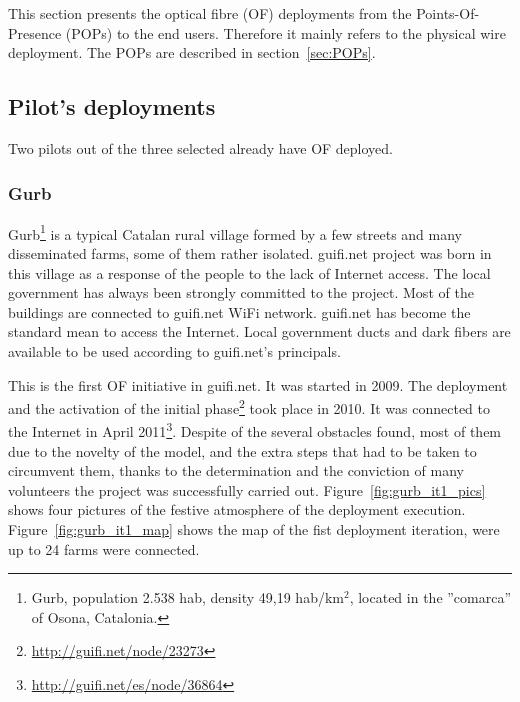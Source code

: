 This section presents the optical fibre (OF) deployments from the Points-Of-Presence (POPs) to the end users. Therefore it mainly refers to the physical wire deployment. The POPs are described in section~\ref{sec:POPs}.


\subsection{Pilot's deployments}

Two pilots out of the three selected already have OF deployed.

\subsubsection{Gurb}

Gurb\footnote{Gurb, population 2.538 hab, density 49,19 hab/km$^{2}$, located in the ''comarca'' of Osona, Catalonia.} is a typical Catalan rural village formed by a few streets and many disseminated farms, some of them rather isolated. guifi.net project was born in this village as a response of the people to the lack of Internet access. The local government has always been strongly committed to the project. Most of the buildings are connected to guifi.net WiFi network. guifi.net has become the standard mean to access the Internet. Local government ducts and dark fibers are available to be used according to guifi.net's principals.

This is the first OF initiative in guifi.net. It was started in 2009. The deployment and the activation of the initial phase\footnote{\url{http://guifi.net/node/23273}} took place in 2010. It was connected to the Internet in April 2011\footnote{\url{http://guifi.net/es/node/36864}}. Despite of the several obstacles found, most of them due to the novelty of the model, and the extra steps that had to be taken to circumvent them, thanks to the determination and the conviction of many volunteers the project was successfully carried out. Figure~\ref{fig:gurb_it1_pics} shows four pictures of the festive atmosphere of the deployment execution. Figure~\ref{fig:gurb_it1_map} shows the map of the fist deployment iteration, were up to 24 farms were connected. 


